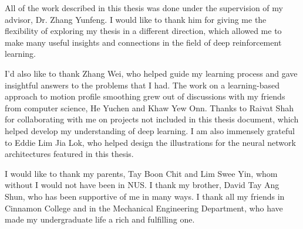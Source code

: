 \begin{acknowledgments}

All of the work described in this thesis was done under the supervision of my advisor, Dr. Zhang Yunfeng. I would like to thank him for giving me the flexibility of exploring my thesis in a different direction, which allowed me to make many useful insights and connections in the field of deep reinforcement learning.

I'd also like to thank Zhang Wei, who helped guide my learning process and gave insightful answers to the problems that I had. The work on a learning-based approach to motion profile smoothing grew out of discussions with my friends from computer science, He Yuchen and Khaw Yew Onn. Thanks to Raivat Shah for collaborating with me on projects not included in this thesis document, which helped develop my understanding of deep learning. I am also immensely grateful to Eddie Lim Jia Lok, who helped design the illustrations for the neural network architectures featured in this thesis.

I would like to thank my parents, Tay Boon Chit and Lim Swee Yin, whom without I would not have been in NUS. I thank my brother, David Tay Ang Shun, who has been supportive of me in many ways. I thank all my friends in Cinnamon College and in the Mechanical Engineering Department, who have made my undergraduate life a rich and fulfilling one.

\end{acknowledgments}
